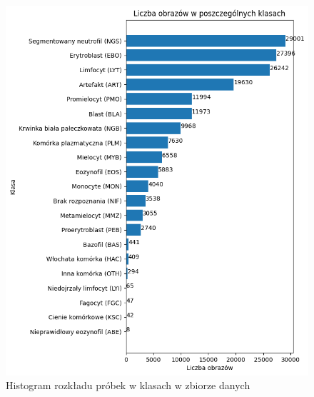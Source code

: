 \begin{figure}
    \includegraphics[width=\textwidth]{images_count}
    \caption{Histogram rozkładu próbek w klasach w zbiorze danych}
    \label{fig:images_count_vis}
\end{figure}

